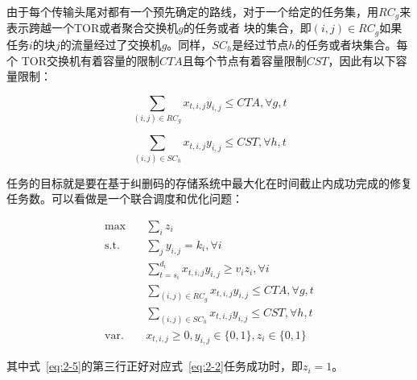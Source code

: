 由于每个传输头尾对都有一个预先确定的路线，对于一个给定的任务集，用$RC_g$来表示跨越一个TOR或者聚合交换机$g$的任务或者
块的集合，即$(i,j)\in RC_g$如果任务$i$的块$j$的流量经过了交换机$g$。同样，$SC_h$是经过节点$h$的任务或者块集合。每个
TOR交换机有着容量的限制$CTA$且每个节点有着容量限制$CST$，因此有以下容量限制：

\begin{equation}
	\label{eq:2-3}
    \sum_{(i, j) \in R C_{g}} x_{t, i, j} y_{i, j} \leq C T A, \forall g, t
\end{equation}


\begin{equation}
	\label{eq:2-4}
    \sum_{(i, j) \in S C_{h}} x_{t, i, j} y_{i, j} \leq C S T, \forall h, t
\end{equation}

任务的目标就是要在基于纠删码的存储系统中最大化在时间截止内成功完成的修复任务数。可以看做是一个联合调度和优化问题：

\begin{equation}
    \begin{aligned}
    \label{eq:2-5}
    \max \quad & \sum_{i} z_{i}  \\
    \mbox{s.t.} \quad & \sum_{j} y_{i, j}=k_{i}, \forall i \\
    & \sum_{t=s_{i}}^{d_{i}} x_{t, i, j} y_{i, j} \geq v_{i} z_{i}, \forall i \\
    & \sum_{(i, j) \in R C_{g}} x_{t, i, j} y_{i, j} \leq C T A, \forall g, t \\
    & \sum_{(i, j) \in S C_{h}} x_{t, i, j} y_{i, j} \leq C S T, \forall h, t \\
    \mbox{var.} \quad & x_{t, i, j} \geq 0, y_{i, j} \in\{0,1\}, z_{i} \in\{0,1\}
    \end{aligned}
\end{equation}

其中式~\ref{eq:2-5}的第三行正好对应式~\ref{eq:2-2}任务成功时，即$z_i=1$。


